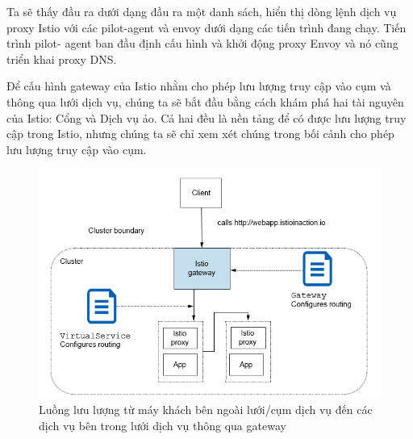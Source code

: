 \documentclass[12pt,a4paper]{report}
\begin{document}
	
		Ta sẽ thấy đầu ra dưới dạng đầu ra một danh sách, hiển thị dòng lệnh dịch vụ proxy Istio với các pilot-agent và envoy dưới dạng các tiến trình đang chạy. Tiến trình pilot- agent ban đầu định cấu hình và khởi động proxy Envoy và nó cũng triển khai proxy DNS.
		
		Để cấu hình gateway của Istio nhằm cho phép lưu lượng truy cập vào cụm và thông qua lưới dịch vụ, chúng ta sẽ bắt đầu bằng cách khám phá hai tài nguyên của Istio: Cổng và Dịch vụ ảo. Cả hai đều là nền tảng để có được lưu lượng truy cập trong Istio, nhưng chúng ta sẽ chỉ xem xét chúng trong bối cảnh cho phép lưu lượng truy cập vào cụm.
		
		
		\break
\begin{figure}[h]
	\centering
	\includegraphics[width=0.7\linewidth]{Pics/2.2.1-p5}
	\caption{Luồng lưu lượng từ máy khách bên ngoài lưới/cụm dịch vụ đến các dịch vụ bên trong lưới dịch vụ thông qua gateway}
	\label{fig:2.2.1-5}
\end{figure}
\end{document}
